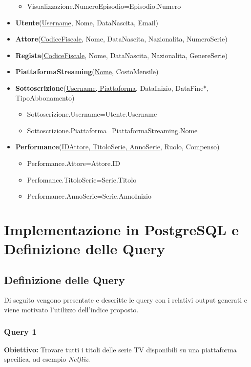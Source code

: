 \documentclass[12pt,a4paper]{article}
\begin{document}
\begin{itemize}
\begin{itemize}
        \item Visualizzazione.NumeroEpisodio=Episodio.Numero
    \end{itemize}
    \item \textbf{Utente}(\underline{Username}, Nome, DataNascita, Email)
    \item \textbf{Attore}(\underline{CodiceFiscale}, Nome, DataNascita, Nazionalita, NumeroSerie)
    \item \textbf{Regista}(\underline{CodiceFiscale}, Nome, DataNascita, Nazionalita, GenereSerie)
    \item \textbf{PiattaformaStreaming}(\underline{Nome}, CostoMensile)
    \item \textbf{Sottoscrizione}(\underline{Username, Piattaforma}, DataInizio, DataFine*, TipoAbbonamento)
    \begin{itemize}
        \item Sottoscrizione.Username=Utente.Username
        \item Sottoscrizione.Piattaforma=PiattaformaStreaming.Nome
    \end{itemize}
    \item \textbf{Performance}(\underline{IDAttore, TitoloSerie, AnnoSerie}, Ruolo, Compenso)
    \begin{itemize}
        \item Performance.Attore=Attore.ID
        \item Perfomance.TitoloSerie=Serie.Titolo
        \item Performance.AnnoSerie=Serie.AnnoInizio
    \end{itemize}
\end{itemize}


\section{Implementazione in PostgreSQL e Definizione delle Query}

\subsection*{Definizione delle Query}

Di seguito vengono presentate e descritte le query con i relativi output generati e 
viene motivato l’utilizzo dell’indice proposto.

\vspace{1cm}

\subsubsection*{Query 1}
\textbf{Obiettivo:} Trovare tutti i titoli delle serie TV disponibili su una piattaforma specifica, ad esempio \textit{Netflix}.
\end{document}
